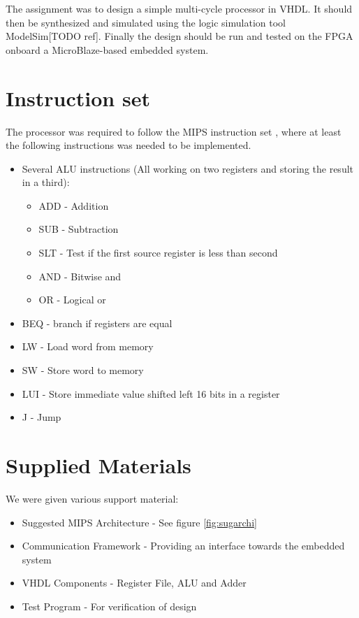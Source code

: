 The assignment was to design a simple multi-cycle processor in VHDL.
It should then be synthesized and simulated using the logic simulation tool ModelSim[TODO ref].
Finally the design should be run and tested on the FPGA onboard a MicroBlaze-based embedded system.

\section{Instruction set}
The processor was required to follow the MIPS instruction set \cite{mips-ref},
where at least the following instructions was needed to be implemented.
\begin{itemize}
    \item Several ALU instructions (All working on two registers and storing the result in a third):
        \begin{itemize}
            \item ADD - Addition
            \item SUB - Subtraction
            \item SLT - Test if the first source register is less than second
            \item AND - Bitwise and
            \item OR  - Logical or
        \end{itemize}
    \item BEQ - branch if registers are equal
    \item LW - Load word from memory
    \item SW - Store word to memory
    \item LUI - Store immediate value shifted left 16 bits in a register
    \item J - Jump
\end{itemize}

\section{Supplied Materials}
We were given various support material:
\begin{itemize}
    \item Suggested MIPS Architecture - See figure \ref{fig:sugarchi}
    \item Communication Framework - Providing an interface towards the embedded system
    \item VHDL Components - Register File, ALU and Adder
    \item Test Program - For verification of design
\end{itemize}

